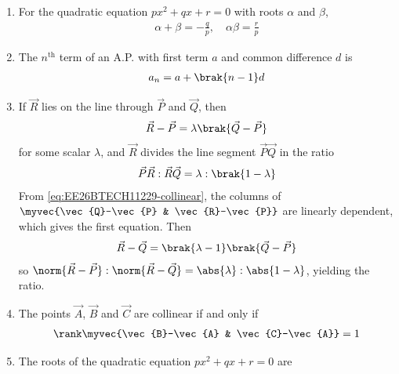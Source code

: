 \begin{enumerate}[label=\thesubsection.\arabic*, ref=\thesubsection.\theenumi]
\begin{align}
	\brak{\vec{A}-\vec{B}}^{\top}\vec{x} = \frac{\norm{\vec{A}}^2 - \norm{\vec{B}}^2}{2}
	\label{eq:EE26BTECH11229-perp-bisector}
\end{align}
\solution
\begin{align}
	\norm{\vec{x}-\vec{A}}^2 &= \norm{\vec{x}-\vec{B}}^2
	\\
	\implies \norm{\vec{x}}^2 - 2\vec{A}^{\top}\vec{x} + \norm{\vec{A}}^2
	&= \norm{\vec{x}}^2 - 2\vec{B}^{\top}\vec{x} + \norm{\vec{B}}^2
\end{align}
which simplifies to \eqref{eq:EE26BTECH11229-perp-bisector}.
\item For the quadratic equation $px^2 + qx + r = 0$ with roots $\alpha$ and $\beta$,
\begin{align}
	\alpha + \beta = -\frac{q}{p}, \quad \alpha\beta = \frac{r}{p}
	\label{eq:EE26BTECH11229-quad-roots}
\end{align}
\item The $n^{\text{th}}$ term of an A.P. with first term $a$ and common difference $d$ is
\begin{align}
	a_n = a + \brak{n-1}d
	\label{eq:EE26BTECH11229-ap-nth}
\end{align}
\item If $\vec{R}$ lies on the line through $\vec{P}$ and $\vec{Q}$, then
\begin{align}
	\vec{R} - \vec{P} = \lambda\brak{\vec{Q} - \vec{P}}
	\label{eq:EE26BTECH11229-ratio-collinear}
\end{align}
for some scalar $\lambda$, and $\vec{R}$ divides the line segment $\vec{P}\vec{Q}$ in the ratio
\begin{align}
	\vec{P}\vec{R} : \vec{R}\vec{Q} = \lambda : \brak{1 - \lambda}
\end{align}
\solution
From \eqref{eq:EE26BTECH11229-collinear}, the columns of $\myvec{\vec{Q}-\vec{P} & \vec{R}-\vec{P}}$ are linearly dependent, which gives the first equation. Then
\begin{align}
	\vec{R} - \vec{Q} = \brak{\lambda - 1}\brak{\vec{Q} - \vec{P}}
\end{align}
so $\norm{\vec{R}-\vec{P}} : \norm{\vec{R}-\vec{Q}} = \abs{\lambda} : \abs{1-\lambda}$, yielding the ratio.
\item The points $\vec{A}$, $\vec{B}$ and $\vec{C}$ are collinear if and only if
\begin{align}
	\rank\myvec{\vec{B}-\vec{A} & \vec{C}-\vec{A}} = 1
	\label{eq:EE26BTECH11229-collinear}
\end{align}
\item The roots of the quadratic equation $px^2 + qx + r = 0$ are

\end{enumerate}
